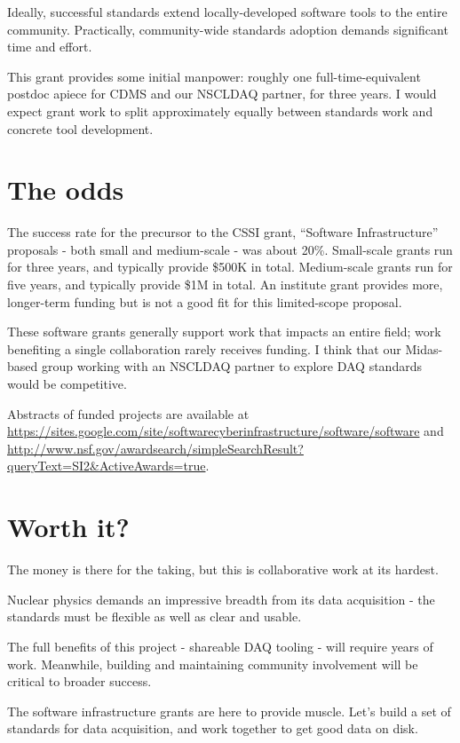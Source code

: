 \documentclass[]{report}   %
\begin{document}
Ideally, successful standards extend locally-developed software tools to the entire community. Practically, community-wide standards adoption demands significant time and effort. 

This grant provides some initial manpower: roughly one full-time-equivalent postdoc apiece for CDMS and our NSCLDAQ partner, for three years.  I would expect grant work to split approximately equally between standards work and concrete tool development.



\section*{The odds}     %
The success rate for the precursor to the CSSI grant, ``Software Infrastructure'' proposals - both small and medium-scale - was about 20\%. Small-scale grants run for three years, and typically
provide \$500K in total. Medium-scale grants run for five years, and typically provide \$1M
in total.  An institute grant provides more, longer-term funding but is not a good fit for this limited-scope proposal.
 
These software grants generally support work that impacts
an entire field; work benefiting a single collaboration rarely receives
funding. %
I think that our Midas-based group working with an NSCLDAQ partner to explore DAQ standards would be competitive.

Abstracts of funded projects are available at
\url{https://sites.google.com/site/softwarecyberinfrastructure/software/software} and
\url{http://www.nsf.gov/awardsearch/simpleSearchResult?queryText=SI2&ActiveAwards=true}.
 

 
\section*{Worth it?}     %
The money is there for the taking, but this is collaborative work at its hardest.  

Nuclear physics demands an impressive breadth from its data acquisition - the standards must be flexible as well as clear and usable.

The full benefits of this project - shareable DAQ tooling - will require years of work.  Meanwhile, building and maintaining community involvement will be critical to broader success.

The software infrastructure grants are here to provide muscle.  Let's build a set of standards for data acquisition, and work together %
to get good data on disk.
\end{document}
